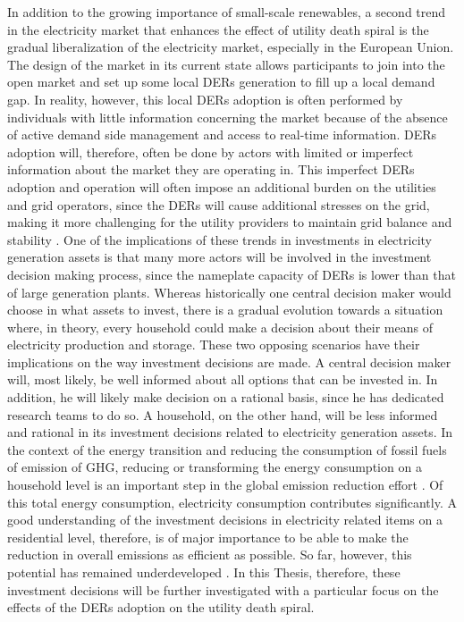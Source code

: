 \noindent
In addition to the growing importance of small-scale renewables, a second trend in the electricity market that enhances the effect of utility death spiral is the gradual liberalization of the electricity market, especially in the European Union. The design of the market in its current state allows participants to join into the open market and set up some local DERs generation to fill up a local demand gap. In reality, however, this local DERs adoption is often performed by individuals with little information concerning the market because of the absence of active demand side management and access to real-time information. DERs adoption will, therefore, often be done by actors with limited or imperfect information about the market they are operating in. This imperfect DERs adoption and operation will often impose an additional burden on the utilities and grid operators, since the DERs will cause additional stresses on the grid, making it more challenging for the utility providers to maintain grid balance and stability \cite{EnergyMarket}. 
\newline \newline \noindent
One of the implications of these trends in investments in electricity generation assets is that many more actors will be involved in the investment decision making process, since the nameplate capacity of DERs is lower than that of large generation plants. Whereas historically one central decision maker would choose in what assets to invest, there is a gradual evolution towards a situation where, in theory, every household could make a decision about their means of electricity production and storage. These two opposing scenarios have their implications on the way investment decisions are made. A central decision maker will, most likely, be well informed about all options that can be invested in. In addition, he will likely make decision on a rational basis, since he has dedicated research teams to do so. A household, on the other hand, will be less informed and rational in its investment decisions related to electricity generation assets. In the context of the energy transition and reducing the consumption of fossil fuels of emission of GHG, reducing or transforming the energy consumption on a household level is an important step in the global emission reduction effort \cite{Totalenergy}. Of this total energy consumption, electricity consumption contributes significantly. A good understanding of the investment decisions in electricity related items on a residential level, therefore, is of major importance to be able to make the reduction in overall emissions as efficient as possible. So far, however, this potential has remained underdeveloped \cite{underdeveloped}. In this Thesis, therefore, these investment decisions will be further investigated with a particular focus on the effects  of the DERs adoption on the utility death spiral.
